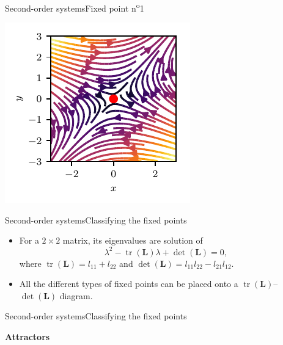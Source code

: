 \documentclass[usenames,dvipsnames,svgnames,10pt,aspectratio=169]{beamer}
\DeclareMathOperator{\trace}{tr}
\begin{document}
\begin{frame}[t, c]{Second-order systems}{Fixed point n\textsuperscript{o}1}
		\begin{minipage}{.48\textwidth}

		\end{minipage}%
		\hfill
		\begin{minipage}{.48\textwidth}
			\centering
			\includegraphics[width=.75\textwidth]{fixed_points_1_bis}
		\end{minipage}

		\vspace{1cm}
\end{frame}

\begin{frame}[t, c]{Second-order systems}{Classifying the fixed points}
	\begin{itemize}
		\item For a $2 \times 2$ matrix, its eigenvalues are solution of
		$$\lambda^2 - \trace({\bm L}) \lambda + \det({\bm L}) = 0,$$
		where $\trace({\bm L}) = l_{11} + l_{22}$ and $\det({\bm L}) = l_{11}l_{22} - l_{21}l_{12}$.

		\bigskip

		\item All the different types of fixed points can be placed onto a $\trace({\bm L})$--$\det({\bm L})$ diagram.
	\end{itemize}

	\vspace{1cm}
\end{frame}

\begin{frame}[t, c]{Second-order systems}{Classifying the fixed points}

\end{frame}

\begin{frame}[t, c]{}
	\centering
	\vspace{1cm}

	{\Large \textbf{Attractors}}

	\bigskip

	{}

\end{frame}
\end{document}
